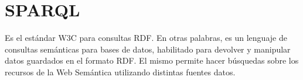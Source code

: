 \documentclass[10pt,a4paper]{article}
\begin{document}

\section{SPARQL}
Es el estándar W3C para consultas RDF. En otras palabras, es un lenguaje de consultas semánticas para bases de datos, habilitado para devolver y manipular datos guardados en el formato RDF. El mismo permite hacer búsquedas sobre los recursos de la Web Semántica utilizando distintas fuentes datos.
\end{document}
